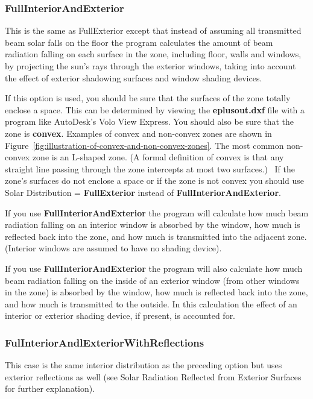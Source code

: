 \subsubsection{FullInteriorAndExterior}\label{fullinteriorandexterior}

This is the same as FullExterior except that instead of assuming all transmitted beam solar falls on the floor the program calculates the amount of beam radiation falling on each surface in the zone, including floor, walls and windows, by projecting the sun's rays through the exterior windows, taking into account the effect of exterior shadowing surfaces and window shading devices.

If this option is used, you should be sure that the surfaces of the zone totally enclose a space. This can be determined by viewing the \textbf{eplusout.dxf} file with a program like AutoDesk's Volo View Express. You should also be sure that the zone is \textbf{convex}. Examples of convex and non-convex zones are shown in Figure~\ref{fig:illustration-of-convex-and-non-convex-zones}. The most common non-convex zone is an L-shaped zone. (A formal definition of convex is that any straight line passing through the zone intercepts at most two surfaces.)~ If the zone's surfaces do not enclose a space or if the zone is not convex you should use Solar Distribution = \textbf{FullExterior} instead of \textbf{FullInteriorAndExterior}.

If you use \textbf{FullInteriorAndExterior} the program will calculate how much beam radiation falling on an interior window is absorbed by the window, how much is reflected back into the zone, and how much is transmitted into the adjacent zone. (Interior windows are assumed to have no shading device).

If you use \textbf{FullInteriorAndExterior} the program will also calculate how much beam radiation falling on the inside of an exterior window (from other windows in the zone) is absorbed by the window, how much is reflected back into the zone, and how much is transmitted to the outside. In this calculation the effect of an interior or exterior shading device, if present, is accounted for.

\subsubsection{FulInteriorAndlExteriorWithReflections}\label{fulinteriorandlexteriorwithreflections}

This case is the same interior distribution as the preceding option but uses exterior reflections as well (see Solar Radiation Reflected from Exterior Surfaces for further explanation).

